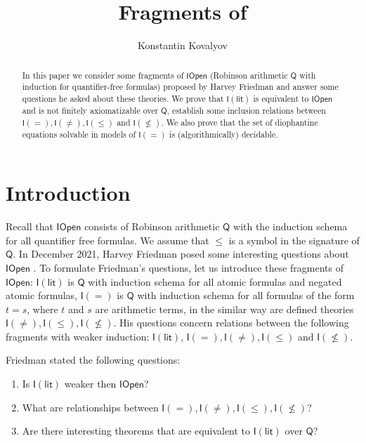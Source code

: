 \documentclass[a4paper,14pt]{article}
\theoremstyle{definition}
\theoremstyle{theorem}
\theoremstyle{lemma}
\theoremstyle{proposition}
\theoremstyle{remark}
\theoremstyle{corollary}
\theoremstyle{problem}
\theoremstyle{hypothesis}
\begin{document}
\title{Fragments of }

\author{Konstantin Kovalyov}


\maketitle

\begin{abstract}
    In this paper we consider some fragments of $\mathsf{IOpen}$ (Robinson arithmetic $\mathsf Q$ with induction for quantifier-free formulas) proposed by Harvey Friedman and answer some questions he asked about these theories. We prove that $\mathsf{I(lit)}$ is equivalent to $\mathsf{IOpen}$ and is not finitely axiomatizable over $\mathsf Q$, establish some inclusion relations between $\mathsf{I(=)}, \mathsf{I(\ne)}, \mathsf{I(\leqslant)}$ and $\mathsf{I} (\nleqslant)$. We also prove that the set of diophantine equations solvable in models of $\mathsf I (=)$ is (algorithmically) decidable. 
\end{abstract}

\section{Introduction}
 Recall that $\mathsf{IOpen}$ consists of Robinson arithmetic $\mathsf{Q}$ with the induction schema for all quantifier free formulas. We assume that $\leq$ is a symbol in the signature of $\mathsf{Q}$. In December 2021, Harvey Friedman posed some interesting questions about $\mathsf{IOpen}$ \cite{fom919}. To formulate Friedman's questions, let us introduce these fragments of $\mathsf{IOpen}$: $\mathsf{I(lit)}$ is $\mathsf Q$ with induction schema for all atomic formulas and negated atomic formulas, $\mathsf{I(=)}$ is $\mathsf Q$ with induction schema for all formulas of the form $t = s$, where $t$ and $s$ are arithmetic terms, in the similar way are defined theories $\mathsf{I(\ne)}, \mathsf{I(\leqslant)}, \mathsf{I(\nleqslant)}$.
His questions concern relations between the following fragments with weaker induction: $\mathsf{I(lit)}$, $\mathsf{I(=)}, \mathsf{I(\ne)}, \mathsf{I(\leqslant)}$ and $\mathsf{I(\nleqslant)}$. 

Friedman stated the following questions:

\begin{enumerate}
    \item Is $\mathsf{I(lit)}$ weaker then $\mathsf{IOpen}$?
    \item What are relationships between $\mathsf{I(=)}, \mathsf{I(\ne)}, \mathsf{I(\leqslant)}, \mathsf{I(\nleqslant)}$?
    \item Are there interesting theorems that are equivalent to $\mathsf{I(lit)}$ over $\mathsf{Q}$?
\end{enumerate}
\end{document}
